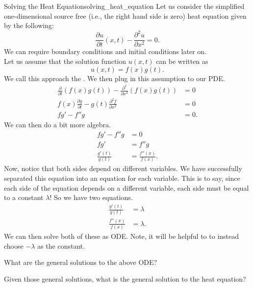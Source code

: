         \begin{ex}{Solving the Heat Equation}{solving_heat_equation}
        Let us consider the simplified one-dimensional source free (i.e., the right hand side is zero) heat equation given by the following:
        \[
        \frac{\partial u}{\partial t}(x,t)-\frac{\partial^2 u}{\partial x^2} = 0.
        \]
        We can require boundary conditions and initial conditions later on.\\
        
        Let us assume that the solution function $u(x,t)$ can be written as
        \[
        u(x,t) = f(x)g(t).
        \]
        We call this approach the . We then plug in this assumption to our PDE.
        \begin{align*}
            \frac{\partial}{\partial t} (f(x)g(t))-\frac{\partial^2}{\partial x^2} (f(x)g(t)) &= 0\\
            f(x)\frac{\partial g}{\partial t}-g(t)\frac{\partial^2 f}{\partial x^2}&=0\\
            fg'-f''g &=0.
        \end{align*}
        We can then do a bit more algebra.
        \begin{align*}
            fg'-f''g&=0\\
            fg'&= f''g\\
            \frac{g'(t)}{g(t)}&=\frac{f''(x)}{f(x)}.
        \end{align*}
        Now, notice that both sides depend on different variables.  We have successfully separated this equation into an equation for each variable.  This is to say, since each side of the equation depends on a different variable, each side must be equal to a constant $\lambda$! So we have two equations.
        \begin{align*}
            \frac{g'(t)}{g(t)}&=\lambda\\
            \frac{f''(x)}{f(x)}&=\lambda.
        \end{align*}
        We can then solve both of these as ODE. Note, it will be helpful to to instead choose $-\lambda$ as the constant.
        \end{ex}
        
        \begin{exercise}
        What are the general solutions to the above ODE?
        \end{exercise}
        
        \begin{exercise}
        Given those general solutions, what is the general solution to the heat equation?
        \end{exercise}
        
